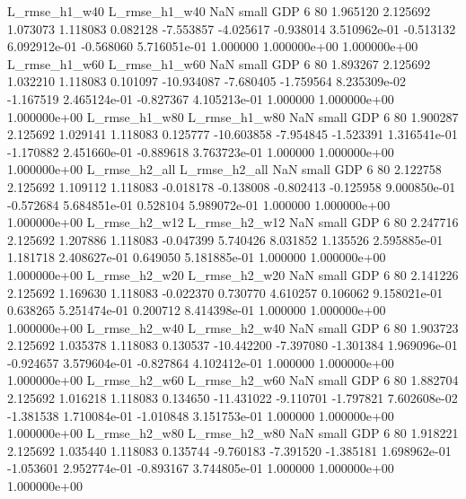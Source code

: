  L_rmse_h1_w40  L_rmse_h1_w40                   NaN      small      GDP                 6 80 1.965120       2.125692 1.073073       1.118083    0.082128     -7.553857     -4.025617    -0.938014   3.510962e-01 -0.513132 6.092912e-01    -0.568060   5.716051e-01            1.000000    1.000000e+00        1.000000e+00
 L_rmse_h1_w60  L_rmse_h1_w60                   NaN      small      GDP                 6 80 1.893267       2.125692 1.032210       1.118083    0.101097    -10.934087     -7.680405    -1.759564   8.235309e-02 -1.167519 2.465124e-01    -0.827367   4.105213e-01            1.000000    1.000000e+00        1.000000e+00
 L_rmse_h1_w80  L_rmse_h1_w80                   NaN      small      GDP                 6 80 1.900287       2.125692 1.029141       1.118083    0.125777    -10.603858     -7.954845    -1.523391   1.316541e-01 -1.170882 2.451660e-01    -0.889618   3.763723e-01            1.000000    1.000000e+00        1.000000e+00
 L_rmse_h2_all  L_rmse_h2_all                   NaN      small      GDP                 6 80 2.122758       2.125692 1.109112       1.118083   -0.018178     -0.138008     -0.802413    -0.125958   9.000850e-01 -0.572684 5.684851e-01     0.528104   5.989072e-01            1.000000    1.000000e+00        1.000000e+00
 L_rmse_h2_w12  L_rmse_h2_w12                   NaN      small      GDP                 6 80 2.247716       2.125692 1.207886       1.118083   -0.047399      5.740426      8.031852     1.135526   2.595885e-01  1.181718 2.408627e-01     0.649050   5.181885e-01            1.000000    1.000000e+00        1.000000e+00
 L_rmse_h2_w20  L_rmse_h2_w20                   NaN      small      GDP                 6 80 2.141226       2.125692 1.169630       1.118083   -0.022370      0.730770      4.610257     0.106062   9.158021e-01  0.638265 5.251474e-01     0.200712   8.414398e-01            1.000000    1.000000e+00        1.000000e+00
 L_rmse_h2_w40  L_rmse_h2_w40                   NaN      small      GDP                 6 80 1.903723       2.125692 1.035378       1.118083    0.130537    -10.442200     -7.397080    -1.301384   1.969096e-01 -0.924657 3.579604e-01    -0.827864   4.102412e-01            1.000000    1.000000e+00        1.000000e+00
 L_rmse_h2_w60  L_rmse_h2_w60                   NaN      small      GDP                 6 80 1.882704       2.125692 1.016218       1.118083    0.134650    -11.431022     -9.110701    -1.797821   7.602608e-02 -1.381538 1.710084e-01    -1.010848   3.151753e-01            1.000000    1.000000e+00        1.000000e+00
 L_rmse_h2_w80  L_rmse_h2_w80                   NaN      small      GDP                 6 80 1.918221       2.125692 1.035440       1.118083    0.135744     -9.760183     -7.391520    -1.385181   1.698962e-01 -1.053601 2.952774e-01    -0.893167   3.744805e-01            1.000000    1.000000e+00        1.000000e+00
